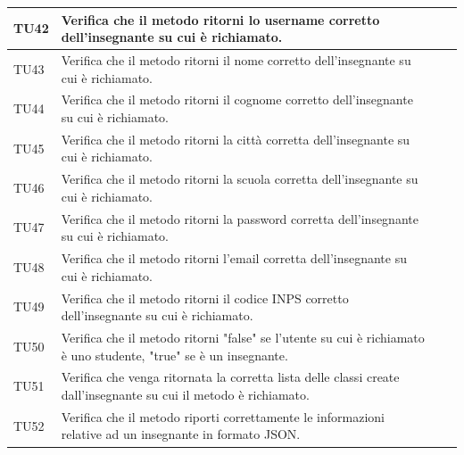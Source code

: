 \begin{longtable}{|>{\centering\arraybackslash}m{1.6cm}|>{\centering\arraybackslash}m{6.41cm}|>{\centering\arraybackslash}m{3.1cm}| c |}
		TU42 & Verifica che il metodo ritorni lo username corretto dell'insegnante su cui è richiamato.\\ \hline
		TU43 & Verifica che il metodo ritorni il nome corretto dell'insegnante su cui è richiamato.  \\ \hline
		TU44 & Verifica che il metodo ritorni il cognome corretto dell'insegnante su cui è richiamato. \\ \hline
		TU45 & Verifica che il metodo ritorni la città corretta dell'insegnante su cui è richiamato.\\ \hline
		TU46 & Verifica che il metodo ritorni la scuola corretta dell'insegnante su cui è richiamato. \\ \hline
		TU47 & Verifica che il metodo ritorni la password corretta dell'insegnante su cui è richiamato. \\ \hline
		TU48 & Verifica che il metodo ritorni l'email corretta dell'insegnante su cui è richiamato. \\ \hline
		TU49 & Verifica che il metodo ritorni il codice INPS corretto dell'insegnante su cui è richiamato. \\ \hline
		TU50 & Verifica che il metodo ritorni "false" se l'utente su cui è richiamato è uno studente, "true" se è un insegnante. \\ \hline
		TU51 & Verifica che venga ritornata la corretta lista delle classi create dall'insegnante su cui il metodo è richiamato.  \\ \hline
		TU52 & Verifica che il metodo riporti correttamente le informazioni relative ad un insegnante in formato JSON. \\ \hline	
		

\end{longtable}

